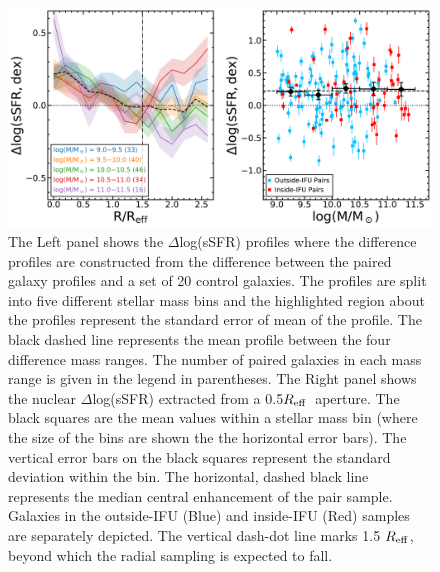 \documentclass[apj,twocolumn]{emulateapj}
\newcommand{\reff}{$R_{\rm eff}$}
\begin{document}
\begin{CJK*}{UTF8}{gbsn}
\begin{figure}
\centering
\includegraphics[width=0.8\linewidth]{ssfr_mass.pdf}
\caption[]{The Left panel shows the $\Delta$log(sSFR) profiles where the difference profiles are constructed from the difference between the paired galaxy profiles and a set of 20 control galaxies. The profiles are split into five different stellar mass bins and the highlighted region about the profiles represent the standard error of mean of the profile. The black dashed line represents the mean profile between the four difference mass ranges. The number of paired galaxies in each mass range is given in the legend in parentheses. The Right panel shows the nuclear $\Delta$log(sSFR) extracted from a 0.5\reff\ aperture. The black squares are the mean values within a stellar mass bin (where the size of the bins are shown the the horizontal error bars). The vertical error bars on the black squares represent the standard deviation within the bin. The horizontal, dashed black line represents the median central enhancement of the pair sample. Galaxies in the outside-IFU (Blue) and inside-IFU (Red) samples are separately depicted. The vertical dash-dot line marks 1.5 \reff, beyond which the radial sampling is expected to fall. 
}
\label{fig:ssfr_mass}
\end{figure}


\end{CJK*}
\end{document}
